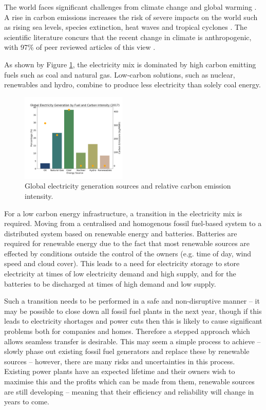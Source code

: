 
The world faces significant challenges from climate change and global warming \cite{Masson-Delmotte2018}. A rise in carbon emissions increases the risk of severe impacts on the world such as rising sea levels, species extinction, heat waves and tropical cyclones \cite{IPCC2014}. The scientific literature concurs that the recent change in climate is anthropogenic, with 97\% of peer reviewed articles of this view \cite{Cook2013}.  

As shown by Figure \ref{fig:fuel_emissions_market_share}, the electricity mix is dominated by high carbon emitting fuels such as coal and natural gas. Low-carbon solutions, such as nuclear, renewables and hydro, combine to produce less electricity than solely coal energy. 



\begin{figure}[b]
	\begin{center}
		\includegraphics[width=0.45\textwidth]{figures/elec_gen_carbon.png}
		\caption{Global electricity generation sources and relative carbon emission intensity. ~\cite{BP2018,Hall1983}}
		\label{fig:fuel_emissions_market_share}
	\end{center}
\end{figure}


For a low carbon energy infrastructure, a transition in the electricity mix is required. Moving from a centralised and homogenous fossil fuel-based system to a distributed system based on renewable energy and batteries. Batteries are required for renewable energy due to the fact that most renewable sources are effected by conditions outside the control of the owners (e.g. time of day, wind speed and cloud cover). This leads to a need for electricity storage to store electricity at times of low electricity demand and high supply, and for the batteries to be discharged at times of high demand and low supply. 

Such a transition needs to be performed in a safe and non-disruptive manner -- it may be possible to close down all fossil fuel plants in the next year, though if this leads to electricity shortages and power cuts then this is likely to cause significant problems both for companies and homes. Therefore a stepped approach which allows seamless transfer is desirable. This may seem a simple process to achieve -- slowly phase out existing fossil fuel generators and replace these by renewable sources -- however, there are many risks and uncertainties in this process. Existing power plants have an expected lifetime and their owners wish to maximise this and the profits which can be made from them, renewable sources are still developing -- meaning that their efficiency and reliability will change in years to come.



